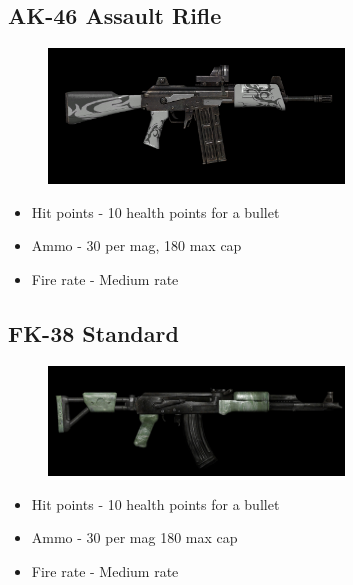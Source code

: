     \subsection{AK-46 Assault Rifle}
        \begin{figure}[H]
            \centering
            \includegraphics[width=0.7\textwidth]{images/weapons/ak46}
        \end{figure}
        \begin{itemize}
            \item Hit points - 10 health points for a bullet
            \item Ammo - 30 per mag, 180 max cap
            \item Fire rate - Medium rate
        \end{itemize}
    \subsection{FK-38 Standard}
        \begin{figure}[H]
            \centering
            \includegraphics[width=0.7\textwidth]{images/weapons/standard}
        \end{figure}
        \begin{itemize}
            \item Hit points - 10 health points for a bullet
            \item Ammo - 30 per mag 180 max cap
            \item Fire rate - Medium rate
        \end{itemize}
